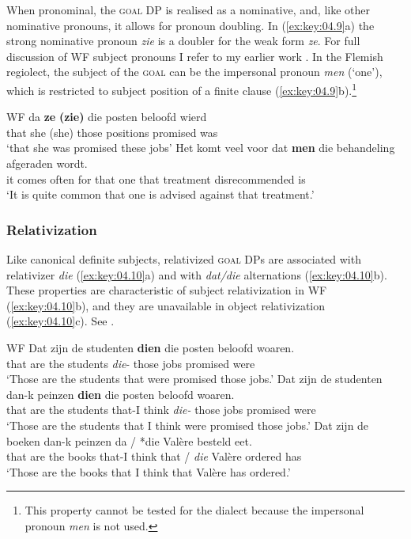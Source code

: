 \documentclass[output=paper]{langsci/langscibook}
\begin{document}
When pronominal, the \textsc{goal} DP is realised as a nominative, and, like other nominative pronouns, it allows for
pronoun doubling. In (\ref{ex:key:04.9}a) the strong nominative pronoun \emph{zie} is a doubler for the weak form \emph{ze}. For full
discussion of \gls{WF} subject pronouns I refer to my earlier
work \parencite{Haegeman1991,Haegeman1992,Haegeman2004}. In the Flemish
regiolect, the subject of the \textsc{goal}  can be the impersonal
pronoun \emph{men} (‘one’), which is restricted to subject position of a finite
clause (\ref{ex:key:04.9}b).\footnote{This property cannot be tested for the
dialect because the impersonal pronoun \emph{men} is not used.}

\ea\label{ex:key:04.9}\glsdesc{WF}
    \ea
    \gll   da   \textbf{ze} \textbf{(zie)}   die posten     beloofd   wierd\\
		    that   she (she)   those positions   promised   was\\
	\glt     ‘that she was promised these jobs’
    \ex
	\gll   Het   komt   veel   voor  dat   \textbf{men}   die   behandeling afgeraden     wordt.\\
		it   comes often   for   that   one   that   treatment disrecommended   is\\
	\glt ‘It is quite common that one is advised against that treatment.’
    \z
\z

\subsubsection{Relativization}

Like canonical definite subjects, relativized
\textsc{goal} DPs are associated with relativizer
\emph{die} (\ref{ex:key:04.10}a) and with \emph{dat/die} alternations
(\ref{ex:key:04.10}b). These properties are characteristic of subject relativization
in \gls{WF} (\ref{ex:key:04.10}b), and they are unavailable in
object relativization (\ref{ex:key:04.10}c). See
\textcite{Haegeman1984,Haegeman1992}.

\ea\label{ex:key:04.10}\glsdesc{WF}
    \ea
	\gll   Dat   zijn   de studenten   \textbf{dien}   die posten   beloofd   woaren.\\
		    that   are   the students   \emph{die}{}-\Pl{}   those jobs   promised   were\\
	\glt     ‘Those are the students that were promised those jobs.’
    \ex
	\gll   Dat   zijn   de   studenten   dan-k   peinzen \textbf{dien}   die   posten   beloofd woaren.\\
		that   are   the   students   that-I   think \emph{die-}\Pl{}   those   jobs   promised were\\
	\glt     ‘Those are the students that I think were promised those jobs.’
    \ex
	\gll   Dat zijn   de boeken   dan-k   peinzen da / *die   Valère     besteld   eet.\\
    that are   the books   that-I   think that {/} \hphantom{*}\emph{die}   Valère   ordered   has\\
	\glt     ‘Those are the books that I think that Valère has ordered.’
    \z
\z
\end{document}
